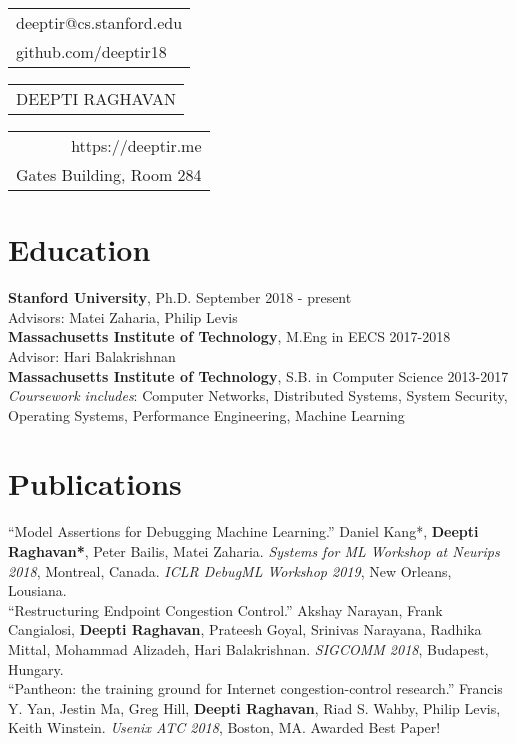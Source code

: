 \documentclass[11pt]{report}
\begin{document}
%
\noindent
{\small\begin{tabular}[c]{l}
	deeptir@cs.stanford.edu \\
	github.com/deeptir18
\end{tabular}}\hfill%
{\Large\bfseries\begin{tabular}[c]{c}
		DEEPTI RAGHAVAN
\end{tabular}}\hfill%
{\small\begin{tabular}[c]{r}
https://deeptir.me \\
Gates Building, Room 284
\end{tabular}}

\bigskip

\section{Education}
\noindent
\textbf{Stanford University}, Ph.D. \hfill September 2018 - present\\
Advisors: Matei Zaharia, Philip Levis\\

\noindent \textbf{Massachusetts Institute of Technology}, M.Eng in EECS \hfill 2017-2018\\
Advisor: Hari Balakrishnan\\

\noindent\textbf{Massachusetts Institute of Technology}, S.B. in Computer Science \hfill 2013-2017\\
\noindent \textit{Coursework includes}: Computer Networks, Distributed Systems, System Security, Operating Systems, Performance Engineering, Machine Learning

\section{Publications}
\noindent``Model Assertions for Debugging Machine Learning.'' Daniel Kang*,
\textbf{Deepti Raghavan*}, Peter Bailis, Matei Zaharia. \textit{Systems for ML Workshop
at Neurips 2018}, Montreal, Canada. \textit{ICLR DebugML Workshop 2019}, New Orleans, Lousiana.\\

\noindent``Restructuring Endpoint Congestion Control.'' Akshay Narayan, Frank Cangialosi, \textbf{Deepti Raghavan}, Prateesh Goyal, Srinivas Narayana, Radhika Mittal, Mohammad Alizadeh, Hari Balakrishnan. \emph{SIGCOMM 2018}, Budapest, Hungary.\\

\noindent ``Pantheon: the training ground for Internet congestion-control research.'' Francis Y. Yan, Jestin Ma, Greg Hill, \textbf{Deepti Raghavan}, Riad S. Wahby, Philip Levis, Keith Winstein. \emph{Usenix ATC 2018}, Boston, MA. Awarded Best Paper!\\
\end{document}
